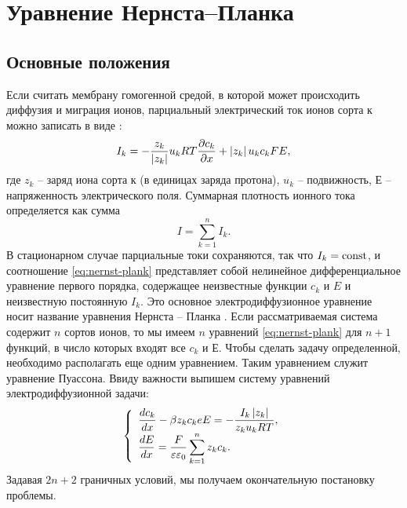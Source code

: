 \chapter{Уравнение Нернста--Планка}
\section{Основные положения}

Если считать мембрану гомогенной средой, в которой может происходить диффузия и
миграция ионов, парциальный электрический ток ионов сорта к можно записать в
виде \cite{bib:8}:
\begin{equation}
    I_k = -\frac{z_k}{\left| z_k \right|}u_kRT\frac{\partial c_k}{\partial x} + \left| z_k \right|u_kc_kFE,
    \label{eq:nernst-plank}
\end{equation}
где \( z_k \) -- заряд иона сорта к (в единицах заряда протона), \( u_k \) --
подвижность, Е -- напряженность электрического поля.
Суммарная плотность ионного тока определяется как сумма
\[
    I = \sum_{k=1}^n I_k.
\]
В стационарном случае парциальные токи сохраняются, так что \( I_k = \mathrm{const} \),
и соотношение \eqref{eq:nernst-plank} представляет собой нелинейное
дифференциальное уравнение первого порядка, содержащее неизвестные функции
\( c_k \) и \( E \) и неизвестную постоянную \( I_k \). Это основное
электродиффузионное уравнение носит название уравнения Нернста -- Планка
\cite{bib:16}.
Если рассматриваемая система содержит \( n \) сортов ионов, то мы имеем \( n \)
уравнений \eqref{eq:nernst-plank} для \( n + 1 \) функций, в число которых
входят все \( c_k \) и \( Е \). Чтобы сделать задачу определенной, необходимо
располагать еще одним уравнением. Таким уравнением служит уравнение Пуассона.
Ввиду важности выпишем систему уравнений электродиффузионной задачи:
\begin{equation}
\left\{
    \begin{array}{l}
        \displaystyle \frac{d c_k}{d x} - \beta z_k c_k e E =
            - \frac{I_k\left| z_k \right|}{z_k u_k RT},\\
        \displaystyle \frac{d E}{d x} = \frac{F}{\varepsilon\varepsilon_0}\sum_{k=1}^n z_k c_k.
    \end{array}
\right.
\label{eq:system_nernst-plank}
\end{equation}
Задавая \( 2n + 2 \) граничных условий, мы получаем окончательную постановку
проблемы.

